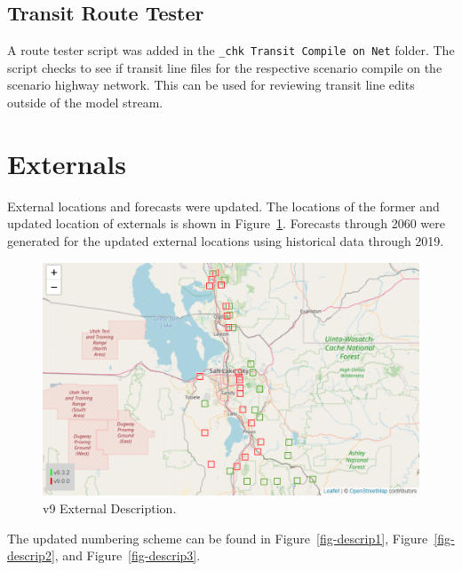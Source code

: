 \documentclass[
  letterpaper,
  DIV=11,
  numbers=noendperiod,
  titlepage=false]{scrreprt}
\begin{document}
\hypertarget{transit-route-tester}{%
\subsection{Transit Route Tester}\label{transit-route-tester}}

A route tester script was added in the
\texttt{\_chk\ Transit\ Compile\ on\ Net} folder. The script checks to
see if transit line files for the respective scenario compile on the
scenario highway network. This can be used for reviewing transit line
edits outside of the model stream.

\hypertarget{externals}{%
\section{Externals}\label{externals}}

External locations and forecasts were updated. The locations of the
former and updated location of externals is shown in
Figure~\ref{fig-externals-pdf}. Forecasts through 2060 were generated
for the updated external locations using historical data through 2019.

\begin{figure}[H]

{\centering \includegraphics{v9x/v900/whats-new/_pictures/externals.png}

}

\caption{\label{fig-externals-pdf}v9 External Description.}

\end{figure}

The updated numbering scheme can be found in Figure~\ref{fig-descrip1},
Figure~\ref{fig-descrip2}, and Figure~\ref{fig-descrip3}.
\end{document}
